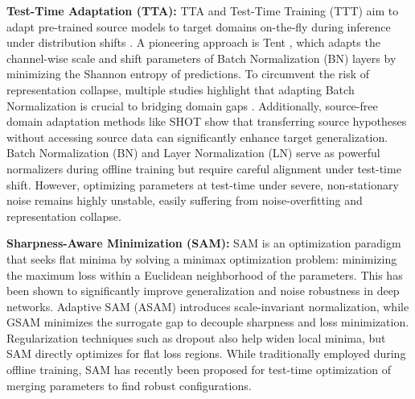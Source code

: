\documentclass{article}
\theoremstyle{plain}
\theoremstyle{definition}
\theoremstyle{remark}
\begin{document}
\textbf{Test-Time Adaptation (TTA):} TTA and Test-Time Training (TTT) aim to adapt pre-trained source models to target domains on-the-fly during inference under distribution shifts \cite{wang2021tent, niu2022efficient, wang2022continual, yuan2023robust, boudiaf2022lame, zancato2023retrieval}. A pioneering approach is Tent \cite{wang2021tent}, which adapts the channel-wise scale and shift parameters of Batch Normalization (BN) layers by minimizing the Shannon entropy of predictions. To circumvent the risk of representation collapse, multiple studies highlight that adapting Batch Normalization is crucial to bridging domain gaps \cite{li2018adaptive, lim2023ttn, ishii2021source, yuan2023TEMA}. Additionally, source-free domain adaptation methods like SHOT \cite{liang2020we} show that transferring source hypotheses without accessing source data can significantly enhance target generalization. Batch Normalization (BN) \cite{ioffe2015batch} and Layer Normalization (LN) \cite{ba2016layer} serve as powerful normalizers during offline training but require careful alignment under test-time shift. However, optimizing parameters at test-time under severe, non-stationary noise remains highly unstable, easily suffering from noise-overfitting and representation collapse.

\textbf{Sharpness-Aware Minimization (SAM):} SAM \cite{foret2021sharpness} is an optimization paradigm that seeks flat minima by solving a minimax optimization problem: minimizing the maximum loss within a Euclidean neighborhood of the parameters. This has been shown to significantly improve generalization and noise robustness in deep networks. Adaptive SAM (ASAM) \cite{wu2021adversarial} introduces scale-invariant normalization, while GSAM \cite{zhuang2022surrogate} minimizes the surrogate gap to decouple sharpness and loss minimization. Regularization techniques such as dropout \cite{srivastava2014dropout} also help widen local minima, but SAM directly optimizes for flat loss regions. While traditionally employed during offline training, SAM has recently been proposed for test-time optimization of merging parameters to find robust configurations.
\end{document}

